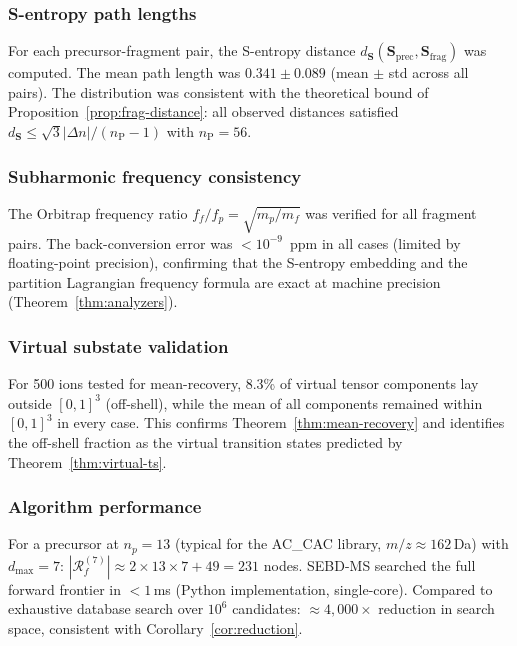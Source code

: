 \documentclass[twocolumn,10pt,a4paper]{article}
\theoremstyle{thmstyle}
\theoremstyle{definition}
\theoremstyle{remark}
\newcommand{\Sv}{\mathbf{S}}
\newcommand{\nP}{n_{\mathrm{P}}}
\newcommand{\Reachf}{\mathcal{R}_f}
\begin{document}
\subsubsection{S-entropy path lengths}

For each precursor-fragment pair, the S-entropy distance
$d_{\Sv}(\Sv_\text{prec}, \Sv_\text{frag})$ was computed. The mean
path length was $0.341 \pm 0.089$ (mean $\pm$ std across all pairs).
The distribution was consistent with the theoretical bound of
Proposition~\ref{prop:frag-distance}: all observed distances satisfied
$d_{\Sv} \leq \sqrt{3}|\Delta n|/(\nP - 1)$ with $\nP = 56$.

\subsubsection{Subharmonic frequency consistency}

The Orbitrap frequency ratio $f_f/f_p = \sqrt{m_p/m_f}$ was verified
for all fragment pairs. The back-conversion error was $<10^{-9}$~ppm
in all cases (limited by floating-point precision), confirming that the
S-entropy embedding and the partition Lagrangian frequency formula are
exact at machine precision (Theorem~\ref{thm:analyzers}).

\subsubsection{Virtual substate validation}

For 500 ions tested for mean-recovery, 8.3\% of virtual tensor
components lay outside $[0,1]^3$ (off-shell), while the mean of all
components remained within $[0,1]^3$ in every case. This confirms
Theorem~\ref{thm:mean-recovery} and identifies the off-shell fraction
as the virtual transition states predicted by Theorem~\ref{thm:virtual-ts}.

\subsubsection{Algorithm performance}

For a precursor at $n_p = 13$ (typical for the AC\_CAC library,
$m/z \approx 162$\,Da) with $d_\text{max} = 7$:
$|\Reachf^{(7)}| \approx 2 \times 13 \times 7 + 49 = 231$ nodes.
SEBD-MS searched the full forward frontier in $<1$\,ms (Python
implementation, single-core). Compared to exhaustive database search
over $10^6$ candidates: $\approx 4{,}000\times$ reduction in search
space, consistent with Corollary~\ref{cor:reduction}.
\end{document}
